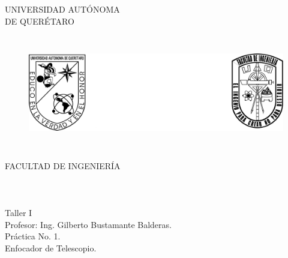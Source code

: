 \documentclass{article}
\newcommand{\fr}{\fuentetitulo\color{black}}
\begin{document}
    \begin{titlepage}
        \vspace*{1cm}
        {\fr\fontsize{30pt}{10pt}\selectfont
        \begin{center}
            UNIVERSIDAD AUTÓNOMA \\DE QUERÉTARO\\
        
            \begin{figure}[H]
                \centering
                \includegraphics[height=5cm]{logos.png}
            \end{figure}
        \fontsize{20pt}{10pt}\selectfont
        \hspace*{2pc}
            FACULTAD DE INGENIERÍA\\
            ~\\ ~\\ ~\\
            Taller I\\
            Profesor: Ing. Gilberto Bustamante Balderas.\\
            Práctica No. 1.\\
            Enfocador de Telescopio.\\ ~\\ ~\\ ~\\
        \end{center}
        
}
\end{titlepage}
\end{document}
